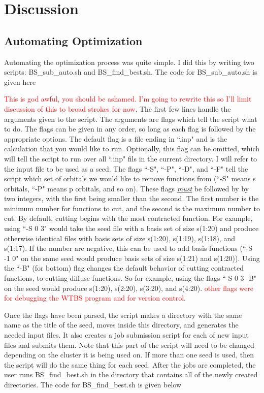 \documentclass[12pt]{report}
\newcommand{\notetodylan}[1]{\textcolor{red}{#1}} %
\begin{document}
\section{Discussion}
\subsection{Automating Optimization}
Automating the optimization process was quite simple. I did this by writing two scripts: BS\_sub\_auto.sh and BS\_find\_best.sh. The code for BS\_sub\_auto.sh is given here



\notetodylan{This is god awful, you should be ashamed. I'm going to rewrite this so I'll limit discussion of this to broad strokes for now}. The first few lines handle the arguments given to the script. The arguments are flags which tell the script what to do. The flags can be given in any order, so long as each flag is followed by the appropriate options. The default flag is a file ending in ``.inp" and is the calculation that you would like to run. Optionally, this flag can be omitted, which will tell the script to run over all ``.inp" fils in the current directory. I will refer to the input file to be used as a seed. The flags ``-S", ``-P", ``-D", and ``-F" tell the script which set of orbitals we would like to remove functions from (``-S" means s orbitals, ``-P" means p orbitals, and so on). These flags \textit{\underline{must}} be followed by by two integers, with the first being smaller than the second. The first number is the minimum number for functions to cut, and the second is the maximum number to cut. By default, cutting begins with the most contracted function. For example, using ``-S 0 3" would take the seed file with a basis set of size s(1:20) and produce otherwise identical files with basis sets of size s(1:20), s(1:19), s(1:18), and s(1:17). If the number are negative, this can be used to add basis functions (``-S -1 0" on the same seed would produce basis sets of size s(1:21) and s(1:20)). Using the ``-B" (for bottom) flag changes the default behavior of cutting contracted functions, to cutting diffuse functions. So for example, using the flags ``-S 0 3 -B" on the seed would produce s(1:20), s(2:20), s(3:20), and s(4:20). \notetodylan{other flags were for debugging the WTBS program and for version control}.

Once the flags have been parsed, the script makes a directory with the same name as the title of the seed, moves inside this directory, and generates the needed input files. It also creates a job submission script for each of new input files and submits them. Note that this part of the script will need to be changed depending on the cluster it is being used on. If more than one seed is used, then the script will do the same thing for each seed. After the jobs are completed, the user runs BS\_find\_best.sh in the directory that contains all of the newly created directories. The code for BS\_find\_best.sh is given below
\end{document}
